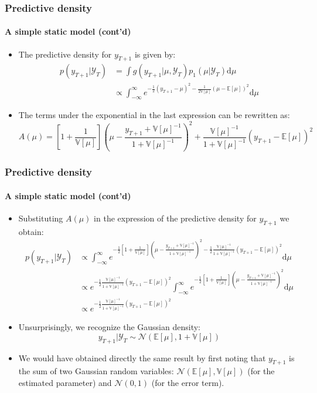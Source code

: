 \documentclass[10pt,slidestop]{beamer}
\newcommand{\normal}[2]{\mathcal N\left(#1,#2\right)}
\newcommand{\AllSample}{ \mathcal Y_T }
\begin{document}
\begin{frame}
  \frametitle{Predictive density}
  \framesubtitle{A simple static model (cont'd)}
  \begin{itemize}
  \item The predictive density for $y_{T+1}$ is given by:
    \[
    \begin{split}
      p(y_{T+1}|\AllSample) &= \int
    g(y_{T+1}|\mu,\AllSample)p_1(\mu|\AllSample)\mathrm d\mu\\
    &\propto \int_{-\infty}^{\infty}e^{-\frac{1}{2}(y_{T+1}-\mu)^2-\frac{1}{2\mathbb
        V[\mu]}(\mu-\mathbb E[\mu])^2}\mathrm d\mu
    \end{split}
    \]
    \item The terms under the exponential in the
    last expression can be rewritten as:
    \[
    A(\mu) = \left[1+\frac{1}{\mathbb
        V[\mu]}\right]\left(\mu-\frac{y_{T+1}+\mathbb
        V[\mu]^{-1}}{1+\mathbb V[\mu]^{-1}}\right)^2+\frac{\mathbb
      V[\mu]^{-1}}{1+\mathbb V[\mu]^{-1}}\left(y_{T+1}-\mathbb E[\mu]\right)^2
    \]
  \end{itemize}
\end{frame}


\begin{frame}
  \frametitle{Predictive density}
  \framesubtitle{A simple static model (cont'd)}
  \begin{itemize}
  \item Substituting $A(\mu)$ in the expression of the predictive
    density for $y_{T+1}$ we obtain:
    \[
    \begin{split}
       p(y_{T+1}|\AllSample) &\propto
       \int_{-\infty}^{\infty}e^{-\frac{1}{2}\left[1+\frac{1}{\mathbb
        V[\mu]}\right]\left(\mu-\frac{y_{T+1}+\mathbb
        V[\mu]^{-1}}{1+\mathbb V[\mu]^{-1}}\right)^2
  -\frac{1}{2}\frac{\mathbb
      V[\mu]^{-1}}{1+\mathbb V[\mu]^{-1}}\left(y_{T+1}-\mathbb
      E[\mu]\right)^2}\mathrm d\mu\\
  &\propto e^{-\frac{1}{2}\frac{\mathbb
      V[\mu]^{-1}}{1+\mathbb V[\mu]^{-1}}\left(y_{T+1}-\mathbb
      E[\mu]\right)^2}\int_{-\infty}^{\infty}e^{-\frac{1}{2}\left[1+\frac{1}{\mathbb
        V[\mu]}\right]\left(\mu-\frac{y_{T+1}+\mathbb
        V[\mu]^{-1}}{1+\mathbb V[\mu]^{-1}}\right)^2}\mathrm d\mu\\
  &\propto e^{-\frac{1}{2}\frac{\mathbb
      V[\mu]^{-1}}{1+\mathbb V[\mu]^{-1}}\left(y_{T+1}-\mathbb
      E[\mu]\right)^2}
    \end{split}
    \]
  \item Unsurprisingly, we recognize the Gaussian density:
    \[
    y_{T+1}|\AllSample \sim \normal{\mathbb E[\mu]}{1+\mathbb V[\mu]}
    \]
  \item We would have obtained directly the same result by first
    noting that $y_{T+1}$ is the sum of two Gaussian random variables:
    $\normal{\mathbb E[\mu]}{\mathbb V[\mu]}$ (for the estimated
    parameter) and $\normal{0}{1}$ (for the error term).
  \end{itemize}

\end{frame}
\end{document}
